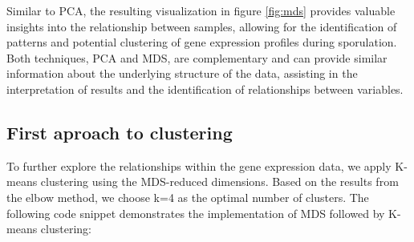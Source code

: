 \documentclass{article}
\begin{document}
Similar to PCA, the resulting visualization in figure \ref{fig:mds} provides valuable insights into the relationship between samples, allowing for the identification of patterns and potential clustering of gene expression profiles during sporulation. Both techniques, PCA and MDS, are complementary and can provide similar information about the underlying structure of the data, assisting in the interpretation of results and the identification of relationships between variables.

\subsection{First aproach to clustering}

To further explore the relationships within the gene expression data, we apply K-means clustering using the MDS-reduced dimensions. Based on the results from the elbow method, we choose k=4 as the optimal number of clusters. The following code snippet demonstrates the implementation of MDS followed by K-means clustering:
\end{document}

